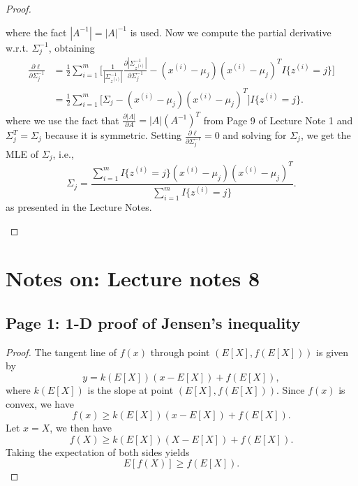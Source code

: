 \documentclass{article}
\begin{document}
\begin{proof}
\begin{enumerate}
                where the fact $|A^{-1}|=|A|^{-1}$ is used. Now we compute the partial derivative w.r.t. $\Sigma_j^{-1}$, obtaining
                \[
                \begin{split}
                \frac{\partial{\ell}}{\partial{\Sigma_j^{-1}}}%
                &=\frac{1}{2}\sum_{i=1}^m\Bigg[\frac{1}{|\Sigma_{z^{(i)}}^{-1}|}
                \frac{\partial{|\Sigma_{z^{(i)}}^{-1}|}}{\partial{\Sigma_j^{-1}}}%
                -(x^{(i)}-\mu_j)(x^{(i)}-\mu_j)^T I\{z^{(i)}=j\}\Bigg]\\
                &=\frac{1}{2}\sum_{i=1}^m\Big[\Sigma_j-(x^{(i)}-\mu_j)(x^{(i)}-\mu_j)^T\Big]
                I\{z^{(i)}=j\}.
                \end{split}
                \]
                where we use the fact that $\frac{\partial{|A|}}{\partial{A}}=|A|(A^{-1})^T$ from Page 9 of Lecture Note 1 and $\Sigma_j^T=\Sigma_j$ because it is symmetric.
                Setting $\frac{\partial{\ell}}{\partial{\Sigma_j^{-1}}}=0$ and solving for $\Sigma_j$, we get the MLE of $\Sigma_j$, i.e.,
                \[
                \Sigma_j=
                \frac{\sum_{i=1}^m I\{z^{(i)}=j\}(x^{(i)}-\mu_j)(x^{(i)}-\mu_j)^T}{\sum_{i=1}^m I\{z^{(i)}=j\}}.
                \]
                as presented in the Lecture Notes.
            \end{enumerate}
\end{proof}


\section{Notes on: Lecture notes 8}
\subsection{Page 1: 1-D proof of Jensen's inequality}
\begin{proof}
The tangent line of $f(x)$ through point $(E[X], f(E[X]))$ is given by
\[
y=k(E[X])(x-E[X])+f(E[X]),
\]
where $k(E[X])$ is the slope at point $(E[X], f(E[X]))$. Since $f(x)$ is convex, we have
\[
f(x)\geq k(E[X])(x-E[X])+f(E[X]).
\]
Let $x=X$, we then have
\[
f(X)\geq k(E[X])(X-E[X])+f(E[X]).
\]
Taking the expectation of both sides yields
\[
E[f(X)]\geq f(E[X]).
\]
\end{proof}
\end{document}
